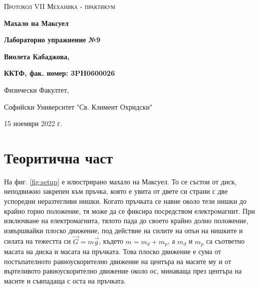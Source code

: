 \documentclass[12pt]{article}
\begin{document}
\begin{titlepage}
	\flushleft
	{\scshape\Large Протокол VII \hspace{1cm} Механика - практикум\par}
	\vspace{5cm}
	{\huge\bfseries Махало на Максуел\par}
	\vspace{1cm}
	{\LARGE\bfseries Лабораторно упражнение №9\par}
	\vspace{5cm}
    {\LARGE\bfseries Виолета Кабаджова, \par}
    {\large\bfseries ККТФ, фак. номер: 3PH0600026\par}
	\vspace{1cm}
	
	{\large Физически Факултет, 
	
	Софийски Университет "Св. Климент Охридски"
	
	15 ноември 2022 г.\par}
	
\end{titlepage}

\section{Теоритична част}\label{sec:theoretical-part}
На фиг. \ref{fig:setup} е илюстрирано махало на Максуел. То се състои от диск, неподвижно закрепен към пръчка, която е увита от двете си страни с две успоредни неразтегливи нишки. Когато пръчката се навие около тези нишки до крайно горно положение, тя може да се фиксира посредством електромагнит. При изключване на електромагнита, тялото пада до своето крайно долно положение, извършвайки плоско движение, под действие на силите на опън на нишките и силата на тежестта си $\vec{G} = m\vec{g}$, където $m = m_d + m_p$, а $m_d$ и $m_p$ са съответно масата на диска и масата на пръчката. Това плоско движение е сума от постъпателното равноускорително движение на центъра на масите му и от въртеливото равноускорително движение около ос, минаваща през центъра на масите и съвпадаща с оста на пръчката.
\end{document}
